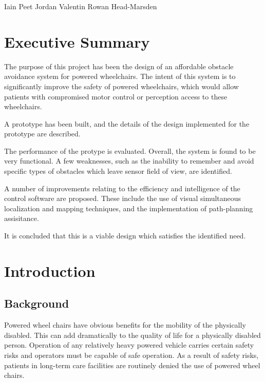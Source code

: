 \documentclass[oneside,final,a4paper]{report}
\begin{document}
Iain Peet \hspace{2cm} Jordan Valentin \hspace{2cm} Rowan Head-Marsden
\clearpage

\pagestyle{plain}
\setcounter{page}{1}

\setcounter{tocdepth}{1}
\tableofcontents

\listoffigures
{}

\chapter*{Executive Summary}
The purpose of this project has been the design of an affordable obstacle avoidance system for powered wheelchairs.  The intent of this system is to significantly improve the safety of powered wheelchairs, which would allow patients with compromised motor control or perception access to these wheelchairs.

A prototype has been built, and the details of the design implemented for the prototype are described.  

The performance of the protype is evaluated.  Overall, the system is found to be very functional.  A few weaknesses, such as the inability to remember and avoid specific types of obstacles which leave sensor field of view, are identified.

A number of improvements relating to the efficiency and intelligence of the control software are proposed.  These include the use of visual simultaneous localization and mapping techniques, and the implementation of  path-planning assisitance.

It is concluded that this is a viable design which satisfies the identified need.

\clearpage
\setcounter{page}{1}
\pagestyle{headings}

\chapter{Introduction}
\section{Background}
Powered wheel chairs have obvious benefits for the mobility of the physically disabled. This can add dramatically to the quality of life for a physically disabled person. Operation of any relatively heavy powered vehicle carries certain safety risks and operators must be capable of safe operation. As a result of safety risks, patients in long-term care facilities are routinely denied the use of powered wheel chairs. 
\end{document}
